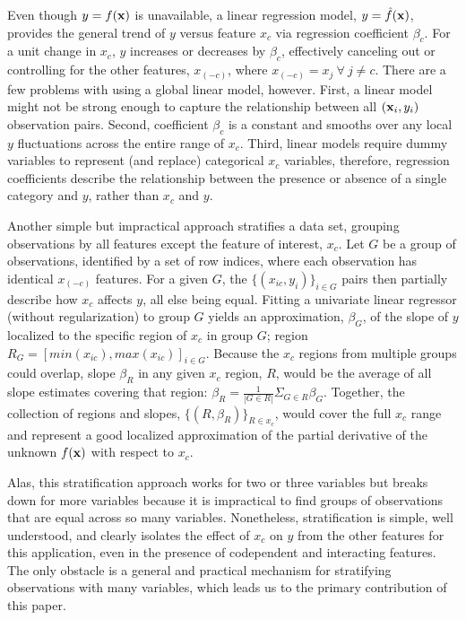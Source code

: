 \documentclass[12pt]{article}
\newcommand{\xnc}{$x_{(-c)}$}
\begin{document}
Even though $y = f(\bf x)$ is unavailable, a linear regression model, $y = \hat{f}(\bf x)$, provides the general trend of $y$ versus feature $x_c$ via regression coefficient $\beta_c$. For a unit change in $x_c$, $y$ increases or decreases by $\beta_c$, effectively canceling out or controlling for the other features, \xnc, where $x_{(-c)} = x_{j} ~\forall~ j \neq c$. There are a few problems with using a global linear model, however.  First, a linear model might not be strong enough to capture the relationship between all $({\bf x}_i, y_i)$ observation pairs. Second, coefficient $\beta_c$ is a constant and smooths over any local $y$ fluctuations across the entire range of $x_c$. Third, linear models require dummy variables to represent (and replace) categorical $x_c$ variables, therefore, regression coefficients describe the relationship between the presence or absence of a single category and $y$, rather than $x_c$ and $y$.

Another simple but impractical approach stratifies a data set, grouping observations by all features except the feature of interest, $x_c$.  Let $G$ be a group of observations, identified by a set of row indices, where each observation has identical \xnc{} features. For a given $G$, the $\{(x_{ic},  y_i)\}_{i \in G}$ pairs then partially describe how $x_c$ affects $y$, all else being equal.  Fitting a univariate linear regressor (without regularization) to group $G$ yields an approximation, $\beta_G$, of the slope of $y$ localized to the specific region of $x_c$ in group $G$; region $R_G = [min(x_{ic}), max(x_{ic})]_{i \in G}$.   Because the $x_c$ regions from multiple groups could overlap, slope $\beta_R$ in any given $x_c$ region, $R$, would be the average of all slope estimates covering that region: $\beta_R = \frac{1}{|G \in R|}\Sigma_{G \in R}\beta_G$. Together, the collection of regions and slopes, $\{(R, \beta_R)\}_{R \in x_c}$, would cover the full $x_c$ range and represent a good localized approximation of the partial derivative of the unknown $f(\bf x)$ with respect to $x_c$.

Alas, this stratification approach works for two or three variables but breaks down for more variables because it is impractical to find groups of observations that are equal across so many variables.  Nonetheless, stratification is simple, well understood, and clearly isolates the effect of $x_c$ on $y$ from the other features for this application, even in the presence of codependent and interacting features.  The only obstacle is a general and practical mechanism for stratifying observations with many variables, which leads us to the primary contribution of this paper.
\end{document}
